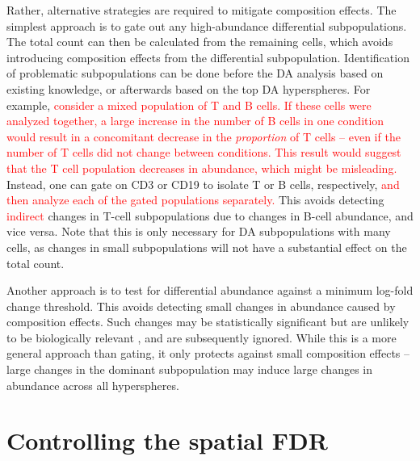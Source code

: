 \documentclass{article}
\newcommand\revised[1]{\textcolor{red}{#1}}
\begin{document}
Rather, alternative strategies are required to mitigate composition effects.
The simplest approach is to gate out any high-abundance differential subpopulations.
The total count can then be calculated from the remaining cells, which avoids introducing composition effects from the differential subpopulation.
Identification of problematic subpopulations can be done before the DA analysis based on existing knowledge, or afterwards based on the top DA hyperspheres.
For example, \revised{consider a mixed population of T and B cells.
    If these cells were analyzed together, a large increase in the number of B cells in one condition would result in a concomitant decrease in the \textit{proportion} of T cells -- even if the number of T cells did not change between conditions.
    This result would suggest that the T cell population decreases in abundance, which might be misleading.} 
Instead, one can gate on CD3 or CD19 to isolate T or B cells, respectively, \revised{and then analyze each of the gated populations separately.}
This avoids detecting \revised{indirect} changes in T-cell subpopulations due to changes in B-cell abundance, and vice versa.
Note that this is only necessary for DA subpopulations with many cells, as changes in small subpopulations will not have a substantial effect on the total count.

Another approach is to test for differential abundance against a minimum log-fold change threshold.
This avoids detecting small changes in abundance caused by composition effects.
Such changes may be statistically significant but are unlikely to be biologically relevant \cite{mccarthy2009treat}, and are subsequently ignored.
While this is a more general approach than gating, it only protects against small composition effects -- large changes in the dominant subpopulation may induce large changes in abundance across all hyperspheres.

\section{Controlling the spatial FDR}
\end{document}
